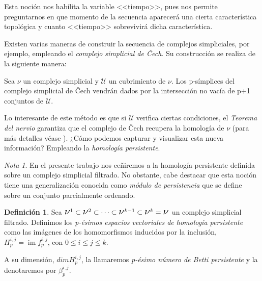 \documentclass[12pt, a4paper, twoside]{book}
\numberwithin{equation}{section}
\theoremstyle{definition}
\newtheorem{defi}{Definición}[section]
\theoremstyle{remark}
\newtheorem*{remark}{Nota}
\theoremstyle{plain}
\DeclareMathOperator{\Ima}{im}
\begin{document}
	Esta noción nos habilita la variable <<tiempo>>, pues nos permite 
	preguntarnos en que momento de la secuencia aparecerá una cierta 
	característica topológica y cuanto <<tiempo>> sobrevivirá dicha 
	característica.

	Existen varias maneras de construir la secuencia de complejos 
	simpliciales, por ejemplo, empleando el \emph{complejo simplicial de 
	Čech}. Su construcción se realiza de la siguiente manera:

	Sea {\Large $\nu$} un complejo simplicial y $\mathcal{U}$ un 
	cubrimiento de {\Large $\nu$}. Los p-símplices del complejo simplicial
	de Čech vendrán dados por la intersección no vacía de p+1 conjuntos de
	$\mathcal{U}$.

	Lo interesante de este método es que si $\mathcal{U}$ verifica ciertas
	condiciones, el \emph{Teorema del nervio} garantiza que el complejo de
	Čech recupera la homología de {\Large $\nu$} (para más detalles véase 
	\cite{TeoremaNervio-Ghrist}). ¿Cómo podemos capturar y visualizar esta 
	nueva información? Empleando la \emph{homología persistente}.

	\begin{remark}
	En el presente trabajo nos ceñiremos a la homología persistente 
	definida sobre un complejo simplicial filtrado. No obstante, cabe 
	destacar que esta noción tiene una generalización conocida como 
	\emph{módulo de persistencia} que se define sobre un conjunto 
	parcialmente ordenado.
	\end{remark}

	\begin{defi}
	Sea $ \text{{\Large $\nu$}$^{1}$} 
		\subset \text{{\Large $\nu$}$^{2}$} \subset \cdots \subset
		\text{{\Large $\nu$}$^{k-1}$} \subset 
		\text{{\Large $\nu$}$^{k}$} = \text{{\Large $\nu$}}$ un 
		complejo simplicial filtrado. Definimos los \textit{p-ésimos
		espacios vectoriales de homología persistente} como las 
		imágenes de los homomorfismos inducidos por la inclusión, 
		$H_{p}^{i,j}=\Ima f_{p}^{i,j}$, con $0\leq i \leq j \leq k$.

		A su dimensión, $dimH_{p}^{i,j}$, la llamaremos \textit{p-ésimo 
		número de Betti persistente} y la denotaremos por 
		$\beta_{p}^{i,j}$.
	\end{defi}
\end{document}
